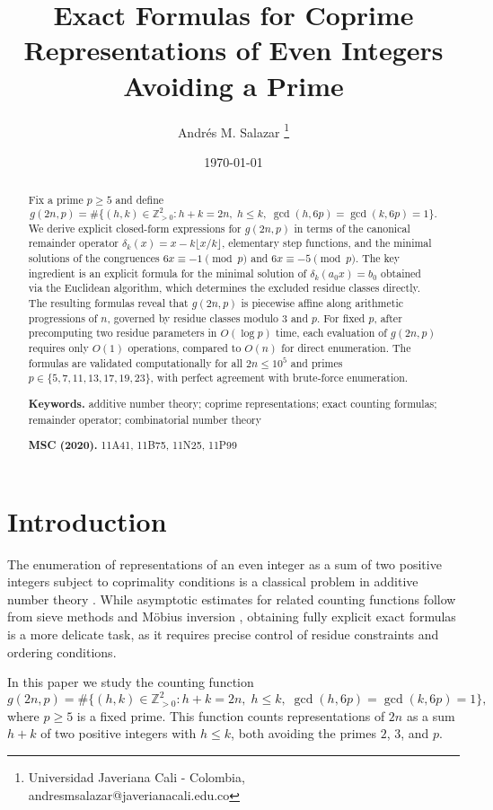 \documentclass[12pt]{article}
\title{Exact Formulas for Coprime Representations of Even Integers Avoiding a Prime}
\author{Andrés M. Salazar \thanks{Universidad Javeriana Cali - Colombia, andresmsalazar@javerianacali.edu.co}}
\date{\today}
\newcommand{\keywords}[1]{%
  \par\noindent\textbf{Keywords.} #1}
\newcommand{\msc}[1]{%
  \par\noindent\textbf{MSC (2020).} #1}
\begin{document}
\maketitle

\begin{abstract}
Fix a prime $p \ge 5$ and define
\[
g(2n,p)
= \#\bigl\{(h,k)\in\mathbb{Z}_{>0}^2 :
h+k=2n,\; h\le k,\;
\gcd(h,6p)=\gcd(k,6p)=1\bigr\}.
\]
We derive explicit closed-form expressions for $g(2n,p)$ in terms
of the canonical remainder operator $\delta_k(x)=x-k\lfloor x/k\rfloor$,
elementary step functions, and the minimal solutions of the
congruences $6x \equiv -1 \pmod{p}$ and $6x \equiv -5 \pmod{p}$.
The key ingredient is an explicit formula for the minimal solution
of $\delta_k(a_0 x)=b_0$ obtained via the Euclidean algorithm,
which determines the excluded residue classes directly.
The resulting formulas reveal that $g(2n,p)$ is piecewise affine
along arithmetic progressions of $n$, governed by residue classes
modulo $3$ and $p$. For fixed $p$, after precomputing two residue
parameters in $O(\log p)$ time, each evaluation of $g(2n,p)$
requires only $O(1)$ operations, compared to $O(n)$ for direct
enumeration. The formulas are validated computationally for all
$2n \le 10^5$ and primes $p \in \{5,7,11,13,17,19,23\}$, with
perfect agreement with brute-force enumeration.


\keywords{additive number theory; coprime representations;
exact counting formulas; remainder operator;
combinatorial number theory}

\msc{11A41, 11B75, 11N25, 11P99}
\end{abstract}



\section{Introduction}
\label{sec:intro}

The enumeration of representations of an even integer as a sum of
two positive integers subject to coprimality conditions is a
classical problem in additive number theory
\cite{HardyWright2008, Nathanson2000}.
While asymptotic estimates for related counting functions follow
from sieve methods and Möbius inversion
\cite{halberstam-richert, iwaniec-kowalski},
obtaining fully explicit exact formulas is a more delicate task,
as it requires precise control of residue constraints and ordering
conditions.

In this paper we study the counting function
\begin{equation}\label{eq:main}
g(2n,p)
= \#\bigl\{(h,k)\in\mathbb{Z}_{>0}^2 :
h+k=2n,\; h\le k,\;
\gcd(h,6p)=\gcd(k,6p)=1\bigr\},
\end{equation}
where $p \ge 5$ is a fixed prime. This function counts representations
of $2n$ as a sum $h+k$ of two positive integers with $h \le k$,
both avoiding the primes $2$, $3$, and $p$.
\end{document}
